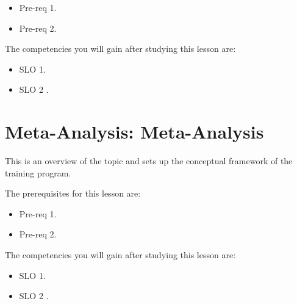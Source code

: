 \begin{itemize}
    \item Pre-req 1.
\end{itemize}

\begin{itemize}
    \item Pre-req 2.
\end{itemize}




The competencies you will gain after studying this lesson are: 




\begin{itemize}
    \item SLO 1.
\end{itemize}

\begin{itemize}
    \item SLO 2 .
\end{itemize}

\section{Meta-Analysis: Meta-Analysis}
\label{sec:meta-analysis-meta-analysis}

This is an overview of the topic and sets up the conceptual framework of the training program.




The prerequisites for this lesson are: 




\begin{itemize}
    \item Pre-req 1.
\end{itemize}

\begin{itemize}
    \item Pre-req 2.
\end{itemize}




The competencies you will gain after studying this lesson are: 




\begin{itemize}
    \item SLO 1.
\end{itemize}

\begin{itemize}
    \item SLO 2 .
\end{itemize}


